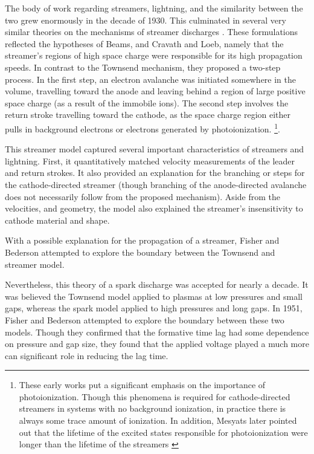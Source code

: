 The body of work regarding streamers, lightning, and the similarity between the
two grew enormously in the decade of 1930. This culminated in several very
similar theories on the mechanisms of streamer discharges \cite{Flegler1936,
Loeb1940, Loeb1940a, Meek1940}. These formulations reflected the hypotheses of
Beams, and Cravath and Loeb, namely that the streamer's regions of high space
charge were responsible for its high propagation speeds. In contrast to the
Townsend mechanism, they proposed a two-step process. In the first step, an
electron avalanche was initiated somewhere in the volume, travelling toward the
anode and leaving behind a region of large positive space charge (as a result of
the immobile ions). The second step involves the return stroke travelling toward
the cathode, as the space charge region either pulls in background electrons or
electrons generated by photoionization. \footnote{These early works put a
significant emphasis on the importance of photoionization. Though this phenomena
is required for cathode-directed streamers in systems with no background
ionization, in practice there is always some trace amount of ionization. In
addition, Mesyats later pointed out that the lifetime of the excited states
responsible for photoionization were longer than the lifetime of the streamers
\cite{Mesyats1972}}.

This streamer model captured several important characteristics of streamers and
lightning. First, it quantitatively matched velocity measurements of the leader
and return strokes. It also provided an explanation for the branching or steps
for the cathode-directed streamer (though branching of the anode-directed
avalanche does not necessarily follow from the proposed mechanism). Aside from
the velocities, and geometry, the model also explained the streamer's
insensitivity to cathode material and shape.

With a possible explanation for the propagation of a streamer, Fisher and Bederson
attempted to explore the boundary between the Townsend and streamer model. 

Nevertheless, this theory of a spark discharge was accepted for nearly a decade.
It was believed the Townsend model applied to plasmas at low pressures and small
gaps, whereas the spark model applied to high pressures and long gaps. In 1951,
Fisher and Bederson attempted to explore the boundary between these two models.
Though they confirmed that the formative time lag had some dependence on
pressure and gap size, they found that the applied voltage played a much more
 can significant role in reducing the lag time.

